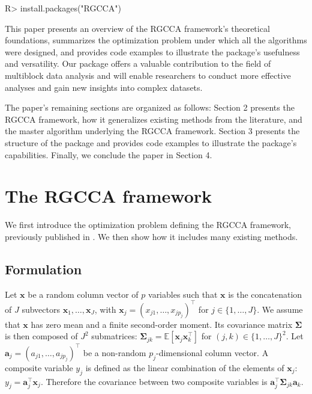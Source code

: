 \documentclass[
]{jss}
\begin{document}
\footnotesize

\begin{CodeChunk}
\begin{CodeInput}
R> install.packages("RGCCA")
\end{CodeInput}
\end{CodeChunk}

\normalsize

This paper presents an overview of the RGCCA framework's theoretical
foundations, summarizes the optimization problem under which all the
algorithms were designed, and provides code examples to illustrate the
package's usefulness and versatility. Our package offers a valuable
contribution to the field of multiblock data analysis and will enable
researchers to conduct more effective analyses and gain new insights
into complex datasets.

The paper's remaining sections are organized as follows: Section 2
presents the RGCCA framework, how it generalizes existing methods from
the literature, and the master algorithm underlying the RGCCA framework.
Section 3 presents the structure of the package and provides code
examples to illustrate the package's capabilities. Finally, we conclude
the paper in Section 4.

\hypertarget{the-rgcca-framework}{%
\section{The RGCCA framework}\label{the-rgcca-framework}}

We first introduce the optimization problem defining the RGCCA
framework, previously published in
\cite{Tenenhaus2011, Tenenhaus2014, Tenenhaus2015, Tenenhaus2017}. We
then show how it includes many existing methods.

\hypertarget{formulation}{%
\subsection{Formulation}\label{formulation}}

Let \(\boldsymbol x\) be a random column vector of \(p\) variables such
that \(\boldsymbol x\) is the concatenation of \(J\) subvectors
\(\boldsymbol x_1, \dots, \boldsymbol x_J\), with
\(\boldsymbol x_j = (x_{j1}, \ldots, x_{jp_j})^\top\) for
\(j \in \{1, \dots, J\}\). We assume that \(\boldsymbol x\) has zero
mean and a finite second-order moment. Its covariance matrix
\(\mathbf \Sigma\) is then composed of \(J^2\) submatrices:
\(\mathbf \Sigma_{jk} = \mathbb{E}\left[\boldsymbol x_j \boldsymbol x_k^\top\right]\)
for \((j, k) \in \{1, \dots, J\}^2\). Let
\(\mathbf a_j = (a_{j1}, \ldots, a_{jp_j})^\top\) be a non-random
\(p_j\)-dimensional column vector. A composite variable \(y_j\) is
defined as the linear combination of the elements of
\(\boldsymbol x_j\): \(y_j = \mathbf a_j^\top \boldsymbol x_j\).
Therefore the covariance between two composite variables is
\(\mathbf{a}_j^\top \mathbf \Sigma_{jk} \mathbf{a}_k\).
\end{document}
